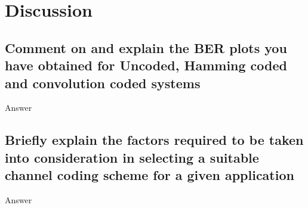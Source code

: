 \documentclass[11pt]{article}
\begin{document}

\section{Discussion}
\subsection{Comment on and explain the BER plots you have obtained for Uncoded, Hamming coded and
convolution coded systems}
Answer
\subsection{Briefly explain the factors required to be taken into consideration in selecting a suitable
channel coding scheme for a given application}
Answer


\end{document}
